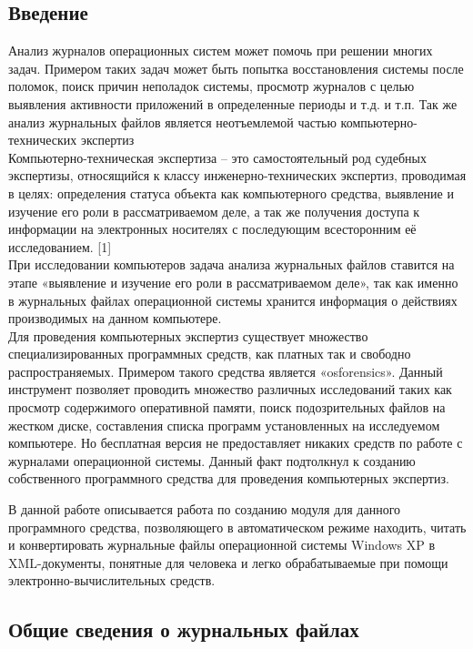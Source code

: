 \subsection{Введение}

Анализ журналов операционных систем может помочь при решении многих задач. Примером таких задач может быть попытка восстановления системы после поломок, поиск причин неполадок системы, просмотр журналов с целью выявления активности приложений в определенные периоды и т.д. и т.п. Так же анализ журнальных файлов является неотъемлемой частью компьютерно-технических экспертиз \\

Компьютерно-техническая экспертиза – это самостоятельный род судебных экспертизы, относящийся к классу инженерно-технических экспертиз, проводимая в целях: определения статуса объекта как компьютерного средства, выявление и изучение его роли в рассматриваемом деле, а так же получения доступа к информации на электронных носителях с последующим всесторонним её исследованием. [1] \\

При исследовании компьютеров задача анализа журнальных файлов ставится на этапе «выявление и изучение его роли в рассматриваемом деле», так как именно в журнальных файлах операционной системы хранится информация о действиях производимых на данном компьютере. \\

Для проведения компьютерных экспертиз существует множество специализированных программных средств, как платных так и свободно распространяемых. Примером такого средства является «osforensics». Данный инструмент позволяет проводить множество различных исследований таких как просмотр содержимого оперативной памяти, поиск подозрительных файлов на жестком диске, составления списка программ установленных на исследуемом компьютере. Но бесплатная версия не предоставляет никаких средств по работе с журналами операционной системы. Данный факт подтолкнул к созданию собственного программного средства для проведения компьютерных экспертиз.

В данной работе описывается работа по созданию модуля для данного программного средства, позволяющего в автоматическом режиме находить, читать и конвертировать журнальные файлы операционной системы Windows XP в XML-документы, понятные для человека и легко обрабатываемые при помощи электронно-вычислительных средств.

\subsection{Общие сведения о журнальных файлах}


